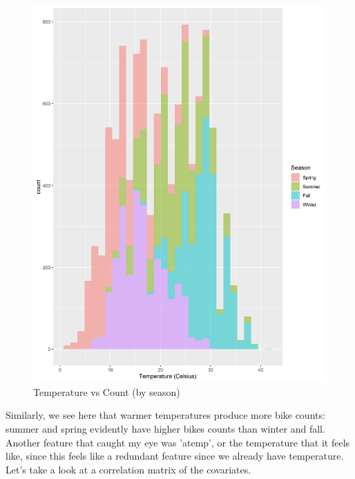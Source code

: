 \documentclass{article}
\begin{document}
\begin{figure}[htp]
    \centering
    \includegraphics[scale = 0.3]{Figures/hist_temp_season.png}
    \caption{Temperature vs Count (by  season)}
    \label{fig:my_label}
\end{figure}
Similarly, we see here that warmer temperatures produce more bike counts: summer and spring evidently have higher bikes counts than winter and fall. \\
\indent Another feature that caught my eye was 'atemp', or the temperature that it feels like, since this feels like a redundant feature since we already have temperature. Let's take a look at a correlation matrix of the covariates.
\end{document}

